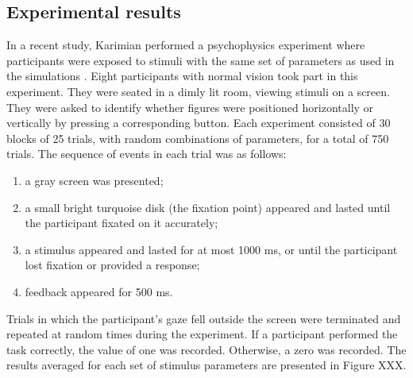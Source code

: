 \subsection{Experimental results}

In a recent study, Karimian performed a psychophysics experiment where participants were exposed to stimuli with the same set of parameters as used in the simulations \cite{MaryamPLACEHOLDER}.
Eight participants with normal vision took part in this experiment. They were seated in a dimly lit room, viewing stimuli on a screen. They were asked to identify whether figures were positioned horizontally or vertically by pressing a corresponding button. Each experiment consisted of 30 blocks of 25 trials, with random combinations of parameters, for a total of 750 trials. The sequence of events in each trial was as follows: 
\begin{enumerate}
    \item a gray screen was presented;
    \item a small bright turquoise disk (the fixation point) appeared and lasted until the participant fixated on it accurately;
    \item a stimulus appeared and lasted for at most 1000 ms, or until the participant lost fixation or provided a response;
    \item feedback appeared for 500 ms.
\end{enumerate}
Trials in which the participant's gaze fell outside the screen were terminated and repeated at random times during the experiment. If a participant performed the task correctly, the value of one was recorded. Otherwise, a zero was recorded.
The results averaged for each set of stimulus parameters are presented in Figure XXX. 
